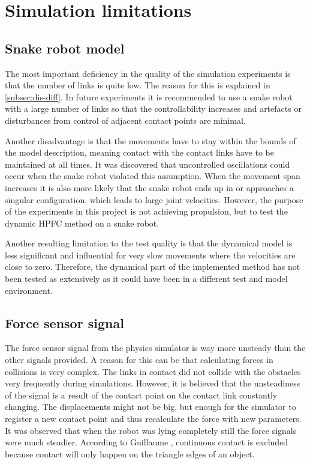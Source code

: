

\section{Simulation limitations}

\subsection{Snake robot model}

The most important deficiency in the quality of the simulation experiments is that the number of links is quite low. The reason for this is explained in \ref{subsec:dis-diff}. In future experiments it is recommended to use a snake robot with a large number of links so that the controllability increases and artefacts or disturbances from control of adjacent contact points are minimal.

Another disadvantage is that the movements have to stay within the bounds of the model description, meaning contact with the contact links have to be maintained at all times. It was discovered that uncontrolled oscillations could occur when the snake robot violated this assumption. When the movement span increases it is also more likely that the snake robot ends up in or approaches a singular configuration, which leads to large joint velocities. However, the purpose of the experiments in this project is not achieving propulsion, but to test the dynamic HPFC method on a snake robot.

Another resulting limitation to the test quality is that the dynamical model is less significant and influential for very slow movements where the velocities are close to zero. Therefore, the dynamical part of the implemented method has not been tested as extensively as it could have been in a different test and model environment.

\subsection{Force sensor signal}

The force sensor signal from the physics simulator is way more unsteady than the other signals provided. A reason for this can be that calculating forces in collisions is very complex. The links in contact did not collide with the obstacles very frequently during simulations. However, it is believed that the unsteadiness of the signal is a result of the contact point on the contact link constantly changing. The displacements might not be big, but enough for the simulator to register a new contact point and thus recalculate the force with new parameters. It was observed that when the robot was lying completely still the force signals were much steadier. According to Guillaume \cite{GuillaumeSnakeSIM}, continuous contact is excluded because contact will only happen on the triangle edges of an object.

